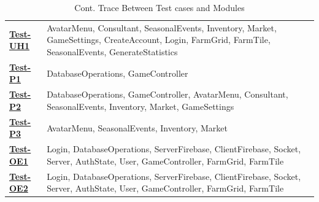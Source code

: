 \documentclass[12pt, titlepage]{article}
\begin{document}
\begin{table}[H]
\begin{tabular}{p{} p{}}
\hyperref[Test-UH1]{\textbf{Test-UH1}} & AvatarMenu, Consultant, SeasonalEvents, Inventory, Market, GameSettings, CreateAccount, Login, FarmGrid, FarmTile, SeasonalEvents, GenerateStatistics\\
\hyperref[Test-P1]{\textbf{Test-P1}} & DatabaseOperations, GameController\\
\hyperref[Test-P2]{\textbf{Test-P2}} & DatabaseOperations, GameController, AvatarMenu, Consultant, SeasonalEvents, Inventory, Market, GameSettings\\
\hyperref[Test-P3]{\textbf{Test-P3}} &   AvatarMenu, SeasonalEvents, Inventory, Market\\
\hyperref[Test-OE1]{\textbf{Test-OE1}} &   Login, DatabaseOperations, ServerFirebase, ClientFirebase, Socket, Server, AuthState, User, GameController, FarmGrid, FarmTile\\
\hyperref[Test-OE2]{\textbf{Test-OE2}} &   Login, DatabaseOperations, ServerFirebase, ClientFirebase, Socket, Server, AuthState, User, GameController, FarmGrid, FarmTile\\
\bottomrule
\end{tabular}
\caption{Cont. Trace Between Test cases and Modules}
\label{TblRT}
\end{table}
\end{document}
